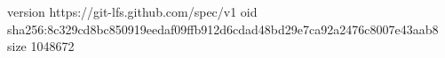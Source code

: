 version https://git-lfs.github.com/spec/v1
oid sha256:8c329cd8bc850919eedaf09ffb912d6cdad48bd29e7ca92a2476c8007e43aab8
size 1048672
